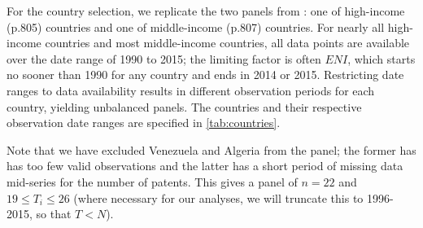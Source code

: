 \documentclass[12pt,a4paper]{article}
\begin{document}
For the country selection, we replicate the two panels from \cite{tibaIncomeTradeOpenness2018}: one of high-income (p.805) countries and one of middle-income (p.807) countries.
For nearly all high-income countries and most middle-income countries, all data points are available over the date range of 1990 to 2015; the limiting factor is often $ENI$, which starts no sooner than 1990 for any country and ends in 2014 or 2015.
Restricting date ranges to data availability results in different observation periods for each country, yielding unbalanced panels.
The countries and their respective observation date ranges are specified in \cref{tab:countries}.

Note that we have excluded Venezuela and Algeria from the panel; the former has has too few valid observations and the latter has a short period of missing data mid-series for the number of patents.
This gives a panel of $n=22$ and $19 \leq T_i \leq 26$ (where necessary for our analyses, we will truncate this to 1996-2015, so that $T < N$).
\end{document}
